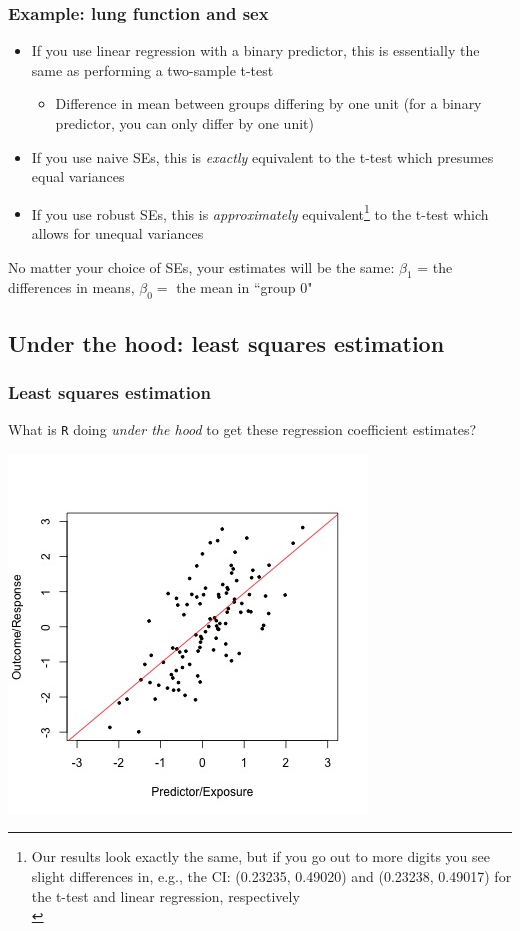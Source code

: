 \documentclass[12pt, 
hyperref={colorlinks=true, linkcolor=blue, urlcolor=cyan}]{beamer}
\begin{document}
\begin{frame}
\frametitle{Example: lung function and sex}

\begin{itemize}
\item \color{blue} If you use linear regression with a binary predictor, this is essentially the same as performing a two-sample t-test \color{black}
	\begin{itemize}
	\item Difference in mean between groups differing by one unit (for a binary predictor, you can only differ by one unit)
	\end{itemize}
\item If you use naive SEs, this is \textit{exactly} equivalent to the t-test which presumes equal variances
\item If you use robust SEs, this is \textit{approximately} equivalent\footnote[frame]{Our results look exactly the same, but if you go out to more digits you see slight differences in, e.g., the CI: (0.23235, 0.49020) and (0.23238, 0.49017) for the t-test and linear regression, respectively\\} to the t-test which allows for unequal variances
\end{itemize}

\vspace{-0.2cm} No matter your choice of SEs, your estimates will be the same: $\beta_1$ = the differences in means, $\beta_0 = $ the mean in ``group 0"


\end{frame}

\subsection{Under the hood: least squares estimation}
\begin{frame}
\frametitle{Least squares estimation}
What is \texttt{R} doing \textit{under the hood} to get these regression coefficient estimates?\vspace{-0.6cm} \pause 

\center \includegraphics[height=0.7\textheight]{./plots/linear-regr}
\end{frame}
\end{document}

